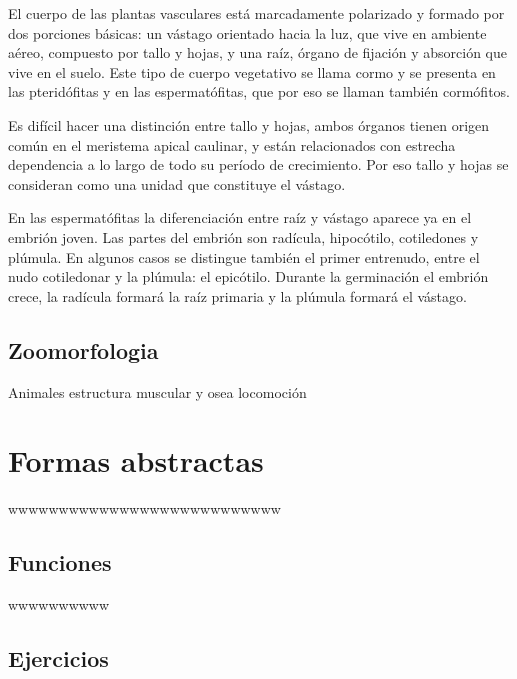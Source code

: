 \documentclass[16pt,]{krantz}
\theoremstyle{definition}
\theoremstyle{definition}
\theoremstyle{definition}
\theoremstyle{definition}
\theoremstyle{remark}
\begin{document}
El cuerpo de las plantas vasculares está marcadamente polarizado y formado por dos porciones básicas: un vástago orientado hacia la luz, que vive en ambiente aéreo, compuesto por tallo y hojas, y una raíz, órgano de fijación y absorción que vive en el suelo. Este tipo de cuerpo vegetativo se llama cormo y se presenta en las pteridófitas y en las espermatófitas, que por eso se llaman también cormófitos.

Es difícil hacer una distinción entre tallo y hojas, ambos órganos tienen origen común en el meristema apical caulinar, y están relacionados con estrecha dependencia a lo largo de todo su período de crecimiento. Por eso tallo y hojas se consideran como una unidad que constituye el vástago.

En las espermatófitas la diferenciación entre raíz y vástago aparece ya en el embrión joven. Las partes del embrión son radícula, hipocótilo, cotiledones y plúmula. En algunos casos se distingue también el primer entrenudo, entre el nudo cotiledonar y la plúmula: el epicótilo. Durante la germinación el embrión crece, la radícula formará la raíz primaria y la plúmula formará el vástago.

\hypertarget{zoomorfologia}{%
\section{Zoomorfologia}\label{zoomorfologia}}

Animales estructura muscular y osea locomoción

\hypertarget{formas-abstractas}{%
\chapter{Formas abstractas}\label{formas-abstractas}}

wwwwwwwwwwwwwwwwwwwwwwwwwww

\hypertarget{funciones}{%
\section{Funciones}\label{funciones}}

wwwwwwwwww \citep{vincze2014college}

\hypertarget{ejercicios}{%
\section{Ejercicios}\label{ejercicios}}

\hypertarget{appendix-apendice}{%
\appendix {}}
\end{document}
